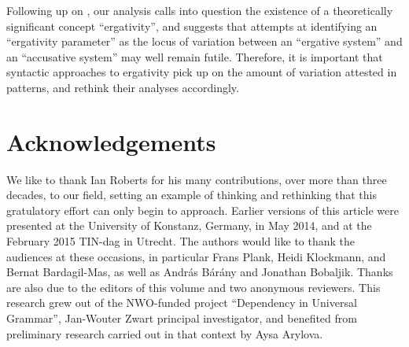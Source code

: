 \documentclass[output=paper]{langsci/langscibook}
\begin{document}
Following up on \citet{DeLancey2004}, our analysis calls into question the
existence of a theoretically significant concept \enquote{ergativity}, and
suggests that attempts at identifying an \enquote{ergativity parameter} as the
locus of variation between an \enquote{ergative system} and an
\enquote{accusative system} may well remain futile. Therefore, it is important
that syntactic approaches to ergativity pick up on the amount of variation
attested in  patterns, and rethink their analyses accordingly.

\printchapterglossary

\section*{Acknowledgements}

We like to thank Ian Roberts for his many contributions, over more than three
decades, to our field, setting an example of thinking and rethinking that this
gratulatory effort can only begin to approach. Earlier versions of this article
were presented at the University of Konstanz, Germany, in May 2014, and at the
February 2015 TIN-dag in Utrecht. The authors would like to thank the audiences
at these occasions, in particular Frans Plank, Heidi Klockmann, and Bernat
Bardagil-Mas, as well as András Bárány and Jonathan Bobaljik. Thanks are also
due to the editors of this volume and two anonymous reviewers. This research
grew out of the NWO-funded project \enquote{Dependency in Universal Grammar},
Jan-Wouter Zwart principal investigator, and benefited from preliminary
research carried out in that context by Aysa Arylova.

{\sloppy\printbibliography[heading=subbibliography,notkeyword=this]}
\end{document}
